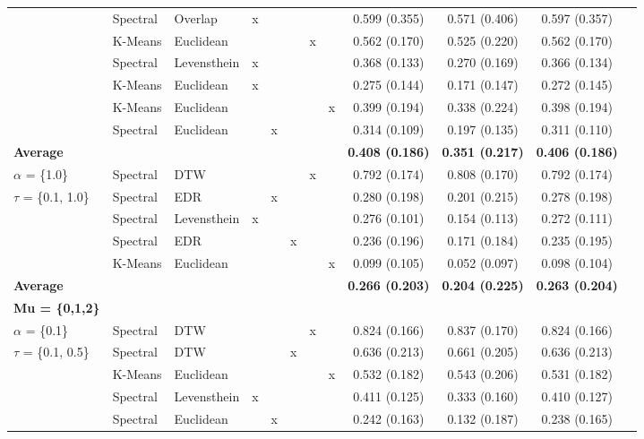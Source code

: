 \documentclass[12pt,a4paper,bibliography=totocnumbered,listof=totocnumbered]{scrartcl}
\begin{document}
\begin{table}[!htbp]
{\begin{tabular}{@{\extracolsep{0pt}} lllccccccccc}
			& Spectral & Overlap & x &  &  &  &  & 0.599 (0.355) & 0.571 (0.406) & 0.597 (0.357) \\ 
			& K-Means & Euclidean &  &  &  & x &  & 0.562 (0.170) & 0.525 (0.220) & 0.562 (0.170) \\ 
			& Spectral & Levensthein & x &  &  &  &  & 0.368 (0.133) & 0.270 (0.169) & 0.366 (0.134) \\ 
			& K-Means & Euclidean & x &  &  &  &  & 0.275 (0.144) & 0.171 (0.147) & 0.272 (0.145) \\ 
			& K-Means & Euclidean &  &  &  &  & x & 0.399 (0.194)  & 0.338 (0.224) & 0.398 (0.194) \\ 
			& Spectral & Euclidean &  & x &  &  &  & 0.314 (0.109) & 0.197 (0.135) & 0.311 (0.110) \\ 
			\hline
			\textbf{Average} &  &  &  &  &  &  &  &   \textbf{0.408 (0.186)} &  \textbf{0.351 (0.217)} &  \textbf{0.406 (0.186)} \\ 
			\hline
			$\alpha$ = \{1.0\} & Spectral  & DTW &  &  &  & x &  & 0.792 (0.174) & 0.808 (0.170) & 0.792 (0.174) \\ 
			$\tau$ = \{0.1, 1.0\} &  Spectral  & EDR &  & x &  &  &  & 0.280 (0.198) & 0.201 (0.215) & 0.278 (0.198) \\ 
			& Spectral  & Levensthein & x &  &  &  &  & 0.276 (0.101) & 0.154 (0.113) & 0.272 (0.111) \\ 
			& Spectral  & EDR &  &  & x &  &  & 0.236 (0.196) & 0.171 (0.184) & 0.235 (0.195) \\ 
			& K-Means & Euclidean  &  &  &  &  & x & 0.099 (0.105) & 0.052 (0.097) & 0.098 (0.104) \\ 
			\hline
			\textbf{Average} &  &  &  &  &  &  &  &   \textbf{0.266 (0.203)} &  \textbf{0.204 (0.225)} &  \textbf{0.263 (0.204)} \\ 
			\hline
			\textbf{Mu = \{0,1,2\}} &  &  &  &  &  &  &  &  &  &  \\ 
			\hline
			$\alpha$ =  \{0.1\} & Spectral & DTW &  &  &  & x &  & 0.824 (0.166) & 0.837 (0.170) & 0.824 (0.166) \\ 
			$\tau$ = 	\{0.1, 0.5\} & Spectral & DTW &  &  & x &  &  & 0.636 (0.213) & 0.661 (0.205) & 0.636 (0.213) \\ 
			& K-Means & Euclidean &  &  &  &  & x & 0.532 (0.182) & 0.543 (0.206) & 0.531 (0.182) \\ 
			& Spectral & Levensthein & x &  &  &  &  & 0.411 (0.125) & 0.333 (0.160) & 0.410 (0.127) \\ 
			& Spectral & Euclidean &  & x &  &  &  & 0.242 (0.163) & 0.132 (0.187) & 0.238 (0.165) \\ 

\end{tabular}}
\end{table}
\end{document}
